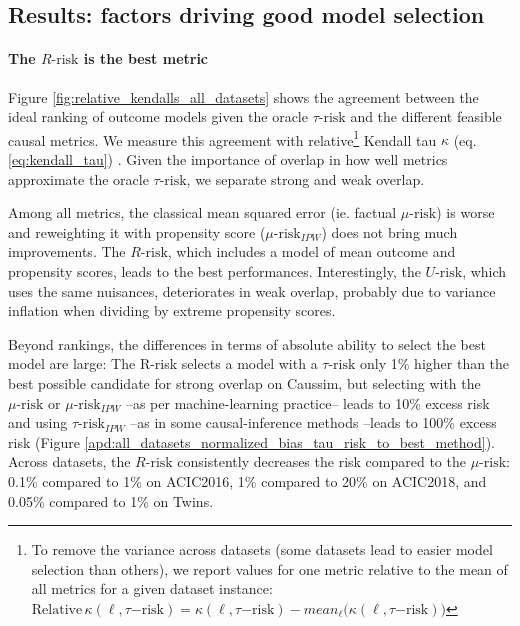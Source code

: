 \documentclass[11pt]{article}
\let\cite=\supercite
\begin{document}
\subsection{Results: factors driving good model selection}\label{empirical_study:results}


\paragraph{The $R\text{-risk}$ is the best metric}

Figure \ref{fig:relative_kendalls_all_datasets} shows the agreement between the
ideal ranking of outcome models given the oracle $\tau\text{-risk}$ and the different
feasible causal metrics. We measure this agreement with relative\footnote{To
    remove the variance across datasets (some datasets lead to easier model
    selection than others), we report values for one metric relative to the mean of
    all metrics for a given dataset instance: $\text{Relative} \,
        \kappa(\ell,\tau\mathrm{{-risk}})= \kappa(\ell,\tau\mathrm{{-risk}}) -
        mean_{\ell}\big(\kappa(\ell,\tau\mathrm{{-risk}})\big)$} Kendall tau $\kappa$
(eq. \ref{eq:kendall_tau}) \cite{kendall_new_1938}. Given the importance of
overlap in how well metrics approximate the oracle $\tau\text{-risk}$, we
separate strong and weak overlap.

Among all metrics, the classical mean squared error (ie. factual
$\mu\text{-risk}$) is worse and reweighting it with propensity score
($\mu\text{-risk}_{IPW}$) does not bring much improvements. The
$R\text{-risk}$, which includes a model of mean outcome and propensity
scores, leads to the best performances. Interestingly, the
$U\text{-risk}$, which uses the same nuisances, deteriorates in weak overlap, probably due to variance
inflation when dividing by extreme propensity scores.

Beyond rankings, the differences in terms of absolute
ability to select the best model are large: The R-risk selects a model
with a $\tau\text{-risk}$ only 1\% higher
than the best
possible candidate for strong overlap on Caussim, but selecting with
the $\mu\text{-risk}$ or $\mu\text{-risk}_{IPW}$ --as per machine-learning
practice-- leads to 10\% excess risk and using $\tau\text{-risk}_{IPW}$
--as in some causal-inference methods \citep{athey2016recursive,gutierrez_causal_2016}--leads to 100\% excess risk
(Figure
\ref{apd:all_datasets_normalized_bias_tau_risk_to_best_method}). Across
datasets, the $R\text{-risk}$ consistently decreases the
risk compared to the $\mu\text{-risk}$:
0.1\% compared to 1\% on ACIC2016,  1\% compared to 20\% on ACIC2018,
and 0.05\% compared to 1\% on Twins.
\end{document}
